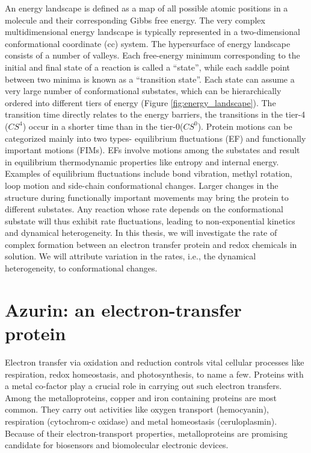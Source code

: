 An energy landscape is defined as a map of all possible atomic positions in a molecule and their corresponding Gibbs free energy.
The very complex multidimensional energy landscape is typically represented in a two-dimensional conformational coordinate (cc) system.
The hypersurface of energy landscape consists of a number of valleys. Each free-energy minimum corresponding to the initial and final state of a reaction is called a ``state'', while each saddle point between two minima is known as a ``transition state''.
Each state can assume a very large number of conformational substates, which can be hierarchically ordered into different tiers of energy (Figure \ref{fig:energy_landscape}).
The transition time directly relates to the energy barriers, the transitions in the tier-4 ($CS^4$) occur in a shorter time than in the tier-0($CS^0$).
Protein motions can be categorized mainly into two types- equilibrium fluctuations (EF) and  functionally important motions (FIMs).\cite{ansari1985protein}
EFs involve motions among the substates and result in equilibrium thermodynamic properties like entropy and internal energy. 
Examples of equilibrium fluctuations include bond vibration, methyl rotation, loop motion and side-chain conformational changes.
Larger changes in the structure during functionally important movements may bring the protein to different substates.
Any reaction whose rate depends on the conformational substate will thus exhibit rate fluctuations, leading to non-exponential kinetics and dynamical heterogeneity.
In this thesis, we will investigate the rate of complex formation between an electron transfer protein and redox chemicals in solution.
We will attribute variation in the rates, i.e., the dynamical heterogeneity, to conformational changes.

\section{Azurin: an electron-transfer protein}
Electron transfer via oxidation and reduction controls vital cellular processes like respiration, redox homeostasis, and photosynthesis, to name a few.
Proteins with a metal co-factor play a crucial role in carrying out such electron transfers.
Among the metalloproteins, copper and iron containing proteins are most common.
They carry out activities like oxygen transport (hemocyanin), respiration (cytochrom-c oxidase) and metal homeostasis (ceruloplasmin).
Because of their electron-transport properties, metalloproteins are promising candidate for biosensors and biomolecular electronic devices.


